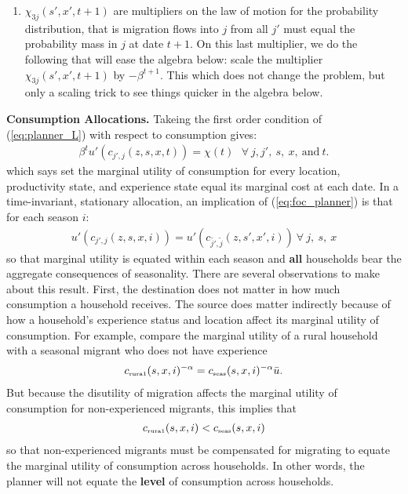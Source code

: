 \documentclass[12pt,pdftex]{article}
\begin{document}
\begin{onehalfspacing}
\begin{enumerate}
\item $\chi_{3j}(s', x', t+1)$ are multipliers on the law of motion for the probability distribution, that is migration flows into $j$ from all $j'$ must equal the probability mass in $j$ at date $t+1$. On this last multiplier, we do the following that will ease the algebra below: scale the multiplier $\chi_{3j}(s', x', t+1)$ by $-\beta^{t+1}$. This which does not change the problem, but only a scaling trick to see things quicker in the algebra below.
\end{enumerate}
\textbf{Consumption Allocations.} Takeing the first order condition of (\ref{eq:planner_L}) with respect to consumption gives:
\begin{align}
\beta^{t}u'(c_{j',j}(z, s, x, t)) = \chi(t) \ \ \ \forall \ j, j', \ s, \ x, \ \mbox{and} \ t.
\label{eq:foc_planner}
\end{align}
which says set the marginal utility of consumption for every location, productivity state, and experience state equal its marginal cost at each date. In a time-invariant, stationary allocation, an implication of (\ref{eq:foc_planner}) is that for each season $i$:
\begin{align}
u'(c_{j',j}(z, s, x, i)) = u'(c_{\tilde{j'},\tilde{j}}(z, s', x', i)) \ \forall \ j, \ s, \ x
\label{eq:foc_planner2}
\end{align}
so that marginal utility is equated within each season and \textbf{all} households bear the aggregate consequences of seasonality. There are several observations to make about this result. First, the destination does not matter in how much consumption a household receives. The source does matter indirectly because of how a household's experience status and location affect its marginal utility of consumption. For example, compare the marginal utility of a rural household with a seasonal migrant who does not have experience
\begin{align}
c_{\mbox{\tiny rura1}}(s, x, i)^{-\alpha} = c_{\mbox{\tiny seas}}(s, x, i)^{-\alpha}\bar u.
\end{align}
But because the disutility of migration affects the marginal utility of consumption for non-experienced migrants, this implies that
\begin{align}
c_{\mbox{\tiny rura1}}(s, x, i) < c_{\mbox{\tiny seas}}(s, x, i)
\end{align}
so that non-experienced migrants must be compensated for migrating to equate the marginal utility of consumption across households. In other words, the planner will not equate the \textbf{level} of consumption across households.


\end{onehalfspacing}
\end{document}
